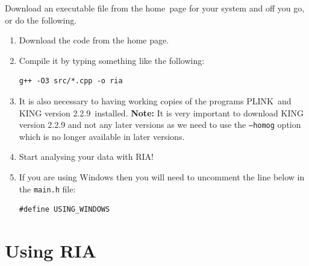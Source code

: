 \documentclass[a4paper,12pt]{article}
\newcommand{\code}[1]{{\footnotesize{{\tt #1}}}}
\begin{document}
Download an executable file from the home~page for your system and off you go, or do the following. 
\begin{enumerate}

\item Download the code from the home page. 
\item Compile it by typing something like the following: \vspace{0.35cm} \begin{lstlisting}
g++ -O3 src/*.cpp -o ria

\end{lstlisting} \vspace{0.35cm}
\item It is also necessary to having working copies of the programs PLINK~and KING version 2.2.9~installed. {\bf Note:} It is very important to download KING version 2.2.9 and not any later versions as we need to use the \code{--homog} option which is no longer available in later versions. 
\item Start analysing your data with RIA! 
\item If you are using Windows then you will need to uncomment the line below in the \code{main.h} file: \vspace{0.35cm} \begin{lstlisting}
#define USING_WINDOWS

\end{lstlisting} \vspace{0.35cm}\end{enumerate}


\section{Using RIA}
\label{using}
\end{document}
